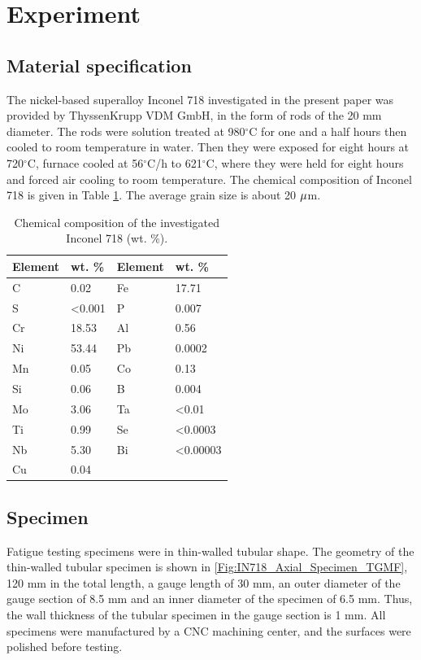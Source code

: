 \documentclass[preprint,5p,twocolumn,11pt,sort&compress]{elsarticle}
\begin{document}
\section{Experiment}

\subsection{Material specification}
The nickel-based superalloy Inconel 718 investigated in the present paper was provided by ThyssenKrupp VDM GmbH, in the form of rods of the 20 mm diameter.
The rods were solution treated at 980$^{\circ}$C for one and a half hours then cooled to room temperature in water.
Then they were exposed for eight hours at 720$^{\circ}$C, furnace cooled at 56$^{\circ}$C/h to 621$^{\circ}$C, where they were held for eight hours and forced air cooling to room temperature.
The chemical composition of Inconel 718 is given in Table \ref{Tab:ChemicalCompositionofIN718}.
The average grain size is about 20 $\rm{\mu }$m.

\begin{table}[htbp]
  \centering
  \caption{Chemical composition of the investigated Inconel 718 (wt. \%).}
    \begin{tabular}{llll}
    \toprule
    Element & wt. \% & Element & wt. \% \\
    \midrule
    C     & 0.02  & Fe    & 17.71 \\
    S     & <0.001 & P     & 0.007 \\
    Cr    & 18.53 & Al    & 0.56 \\
    Ni    & 53.44 & Pb    & 0.0002 \\
    Mn    & 0.05  & Co    & 0.13 \\
    Si    & 0.06  & B     & 0.004 \\
    Mo    & 3.06  & Ta    & <0.01 \\
    Ti    & 0.99  & Se    & <0.0003 \\
    Nb    & 5.30  & Bi    & <0.00003 \\
    Cu    & 0.04  &       &  \\
    \bottomrule
    \end{tabular}%
  \label{Tab:ChemicalCompositionofIN718}
\end{table}

\subsection{Specimen}
Fatigue testing specimens were in thin-walled tubular shape. The geometry of the thin-walled tubular specimen is shown in \autoref{Fig:IN718_Axial_Specimen_TGMF}, 120 mm in the total length, a gauge length of 30 mm, an outer diameter of the gauge section of 8.5 mm and an inner diameter of the specimen of 6.5 mm. Thus, the wall thickness of the tubular specimen in the gauge section is 1 mm. All specimens were manufactured by a CNC machining center, and the surfaces were polished before testing. 
\end{document}

